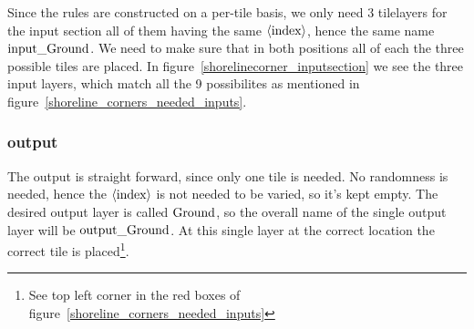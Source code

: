 Since the rules are constructed on a per-tile basis, we only need 3 tilelayers
for the input section all of them having the same $\langle \textup{index} \rangle$,
hence the same name $\textup{input}\_\textup{Ground}$.
We need to make sure that in both positions all of each the three possible
tiles are placed. In figure~\ref{shorelinecorner_inputsection} we see the three input layers,
which match all the 9 possibilites as mentioned in figure~\ref{shoreline_corners_needed_inputs}.

\subsubsection{output}



The output is straight forward, since only one tile is needed. 
No randomness is needed, hence the $\langle \textup{index} \rangle$ is not needed to be varied, so it's kept empty.
The desired output layer is called $\textup{Ground}$, so the overall name of the single output layer
will be $\textup{output}\_\textup{Ground}$. At this single layer at the correct location the correct tile 
is placed\footnote{See top left corner in the red boxes of figure~\ref{shoreline_corners_needed_inputs}}.

